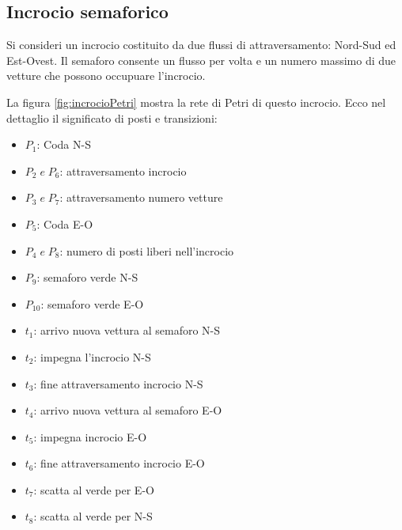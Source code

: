 \documentclass[a4paper]{report}
\begin{document}
\subsection{Incrocio semaforico}
Si consideri un incrocio costituito da due flussi di attraversamento:
Nord-Sud ed Est-Ovest. Il semaforo consente un flusso per volta e un
numero massimo di due vetture che possono occupuare l'incrocio.

La figura \ref{fig:incrocioPetri} mostra la rete di Petri di questo
incrocio. Ecco nel dettaglio il significato di posti e transizioni:
\begin{itemize}
\item $P_1$: Coda N-S
\item $P_2 \; e \; P_6$: attraversamento incrocio
\item $P_3 \; e \; P_7$: attraversamento numero vetture
\item $P_5$: Coda E-O
\item $P_4 \; e \; P_8$: numero di posti liberi nell'incrocio
\item $P_9$: semaforo verde N-S
\item $P_{10}$: semaforo verde E-O
\end{itemize}

\begin{itemize}
\item $t_1$: arrivo nuova vettura al semaforo N-S
\item $t_2$: impegna l'incrocio N-S
\item $t_3$: fine attraversamento incrocio N-S
\item $t_4$: arrivo nuova vettura al semaforo E-O
\item $t_5$: impegna incrocio E-O
\item $t_6$: fine attraversamento incrocio E-O
\item $t_7$: scatta al verde per E-O
\item $t_8$: scatta al verde per N-S
\end{itemize}
\end{document}
